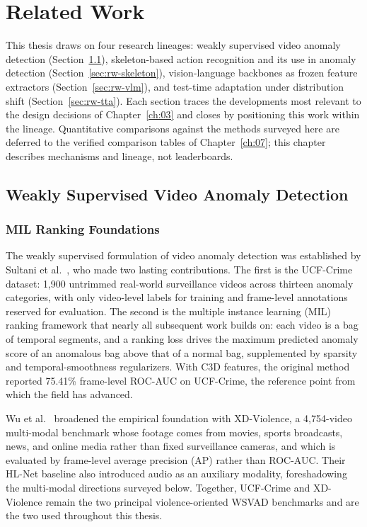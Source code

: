 \chapter{Related Work}
\label{ch:02}

This thesis draws on four research lineages: weakly supervised video anomaly detection
(Section~\ref{sec:rw-wsvad}), skeleton-based action recognition and its use in anomaly detection
(Section~\ref{sec:rw-skeleton}), vision-language backbones as frozen feature extractors
(Section~\ref{sec:rw-vlm}), and test-time adaptation under distribution shift
(Section~\ref{sec:rw-tta}). Each section traces the developments most relevant to the design
decisions of Chapter~\ref{ch:03} and closes by positioning this work within the lineage.
Quantitative comparisons against the methods surveyed here are deferred to the verified
comparison tables of Chapter~\ref{ch:07}; this chapter describes mechanisms and lineage, not
leaderboards.

\section{Weakly Supervised Video Anomaly Detection}
\label{sec:rw-wsvad}

\subsection{MIL Ranking Foundations}

The weakly supervised formulation of video anomaly detection was established by Sultani et
al.~\cite{sultani2018ucfcrime}, who made two lasting contributions. The first is the UCF-Crime
dataset: 1,900 untrimmed real-world surveillance videos across thirteen anomaly categories, with
only video-level labels for training and frame-level annotations reserved for evaluation. The
second is the multiple instance learning (MIL) ranking framework that nearly all subsequent work
builds on: each video is a bag of temporal segments, and a ranking loss drives the maximum
predicted anomaly score of an anomalous bag above that of a normal bag, supplemented by sparsity
and temporal-smoothness regularizers. With C3D features, the original method reported 75.41\%
frame-level ROC-AUC on UCF-Crime, the reference point from which the field has advanced.

Wu et al.~\cite{wu2020xdviolence} broadened the empirical foundation with XD-Violence, a
4,754-video multi-modal benchmark whose footage comes from movies, sports broadcasts, news, and
online media rather than fixed surveillance cameras, and which is evaluated by frame-level average
precision (AP) rather than ROC-AUC. Their HL-Net baseline also introduced audio as an auxiliary
modality, foreshadowing the multi-modal directions surveyed below. Together, UCF-Crime and
XD-Violence remain the two principal violence-oriented WSVAD benchmarks and are the two used
throughout this thesis.

